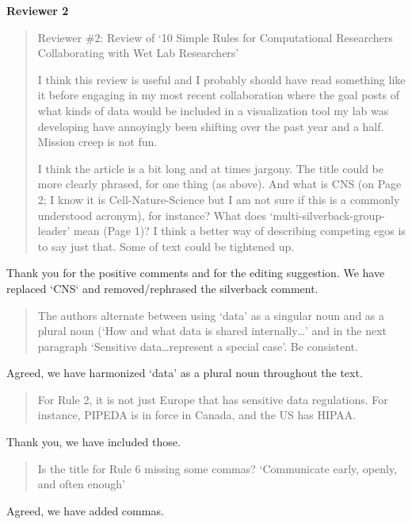 \documentclass[a4paper]{article}
\begin{document}
\noindent \textbf{Reviewer 2}

\begin{quote}
    Reviewer \#2: Review of `10 Simple Rules for Computational Researchers Collaborating with Wet Lab Researchers'

I think this review is useful and I probably should have read something like it before engaging in my most recent collaboration where the goal posts of what kinds of data would be included in a visualization tool my lab was developing have annoyingly been shifting over the past year and a half. Mission creep is not fun.

I think the article is a bit long and at times jargony. The title could be more clearly phrased, for one thing (as above). And what is CNS (on Page 2; I know it is Cell-Nature-Science but I am not sure if this is a commonly understood acronym), for instance? What does `multi-silverback-group-leader' mean (Page 1)? I think a better way of describing competing egos is to say just that. Some of text could be tightened up.


\end{quote}

Thank you for the positive comments and for the editing suggestion. We have replaced `CNS` and removed/rephrased the silverback comment.

\begin{quote}
    The authors alternate between using `data' as a singular noun and as a plural noun (`How and what data is shared internally…' and in the next paragraph `Sensitive data…represent a special case'. Be consistent.

\end{quote}

Agreed, we have harmonized `data' as a plural noun throughout the text.


\begin{quote}
    For Rule 2, it is not just Europe that has sensitive data regulations. For instance, PIPEDA is in force in Canada, and the US has HIPAA.

\end{quote}

Thank you, we have included those.

\begin{quote}
    Is the title for Rule 6 missing some commas? `Communicate early, openly, and often enough'

\end{quote}

Agreed, we have added commas.
\end{document}
